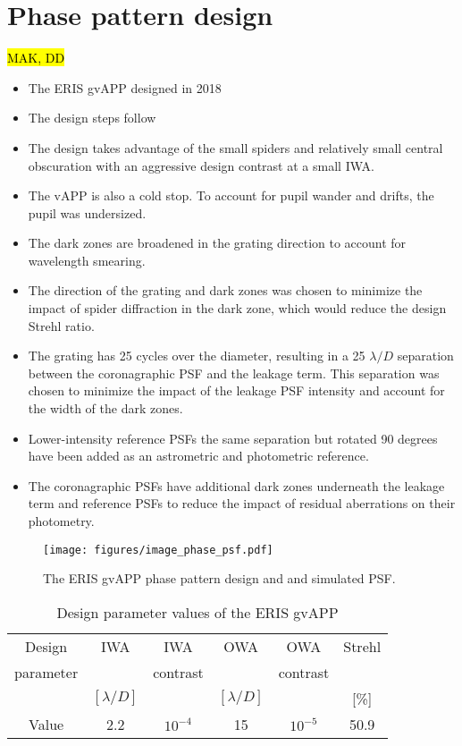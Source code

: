 \documentclass{aa}
\begin{document}
\section{Phase pattern design}

\hl{MAK, DD}

\begin{itemize}
    \item The ERIS gvAPP designed in 2018
    
    \item The design steps follow \cite{2021ApOpt..60D..52D}
    \item The design takes advantage of the small spiders and relatively small central obscuration with an aggressive design contrast at a small IWA.
    \item The vAPP is also a cold stop.  To account for pupil wander and drifts, the pupil was undersized.  
    \item The dark zones are broadened in the grating direction to account for wavelength smearing.
    \item The direction of the grating and dark zones was chosen to  minimize the impact of spider diffraction in the dark zone, which would reduce the design Strehl ratio.
    \item The grating has 25 cycles over the diameter, resulting in a 25 $\lambda/D$ separation between the coronagraphic PSF and the leakage term. This separation was chosen to minimize the impact of the leakage PSF intensity and account for the width of the dark zones.
    \item Lower-intensity reference PSFs the same separation but rotated  90 degrees have been added as an astrometric and photometric reference.
    \item  The coronagraphic PSFs have additional dark zones underneath the leakage term and reference PSFs to reduce the impact of residual aberrations on their photometry.

\end{itemize}


\begin{figure}
    \centering
    \texttt{[image: figures/image\_phase\_psf.pdf]}
    \caption{The ERIS gvAPP phase pattern design and and simulated PSF.}
    \label{fig:gvAPP_phase}
\end{figure}

\begin{table}[h!]
\label{tab:design_param}
\caption{Design parameter values of the ERIS gvAPP}
\begin{tabular}{c|c|c|c|c|c}
     Design & IWA & IWA & OWA & OWA  & Strehl\\
     parameter&& contrast&& contrast&\\
     \hline     
     &$[\lambda/D]$& &$[\lambda/D]$ & & [\%]\\
    \hline
     Value & 2.2 &  $10^{-4}$ &15 &  $10^{-5}$ & 50.9\\
\end{tabular}
\end{table}
\end{document}
